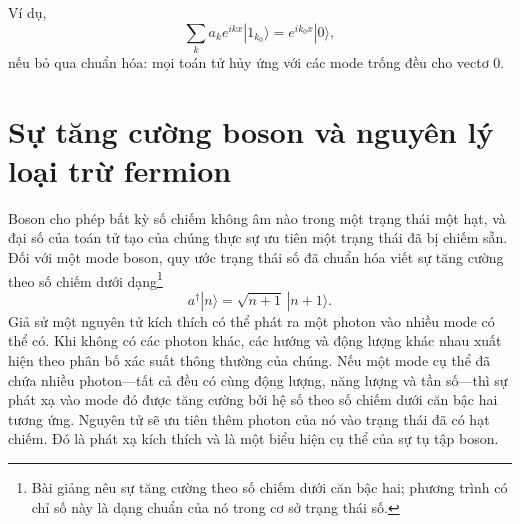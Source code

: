 \begin{classroomqa}
\end{classroomqa}

\begin{classroomqa}
\end{classroomqa}

\begin{classroomqa}
\end{classroomqa}

Ví dụ,
\begin{equation}
\sum_k a_k e^{ikx}|1_{k_0}\rangle
=e^{ik_0x}|0\rangle,
\end{equation}
nếu bỏ qua chuẩn hóa: mọi toán tử hủy ứng với các mode trống đều cho vectơ 0.

\section{Sự tăng cường boson và nguyên lý loại trừ fermion}

Boson cho phép bất kỳ số chiếm không âm nào trong một trạng thái một hạt, và đại số của toán tử tạo của chúng thực sự ưu tiên một trạng thái đã bị chiếm sẵn. Đối với một mode boson, quy ước trạng thái số đã chuẩn hóa viết sự tăng cường theo số chiếm dưới dạng\footnote{Bài giảng nêu sự tăng cường theo số chiếm dưới căn bậc hai; phương trình có chỉ số này là dạng chuẩn của nó trong cơ sở trạng thái số.}
\begin{equation}
a^\dagger|n\rangle=\sqrt{n+1}\,|n+1\rangle.
\end{equation}
Giả sử một nguyên tử kích thích có thể phát ra một photon vào nhiều mode có thể có. Khi không có các photon khác, các hướng và động lượng khác nhau xuất hiện theo phân bố xác suất thông thường của chúng. Nếu một mode cụ thể đã chứa nhiều photon---tất cả đều có cùng động lượng, năng lượng và tần số---thì sự phát xạ vào mode đó được tăng cường bởi hệ số theo số chiếm dưới căn bậc hai tương ứng. Nguyên tử sẽ ưu tiên thêm photon của nó vào trạng thái đã có hạt chiếm. Đó là phát xạ kích thích và là một biểu hiện cụ thể của sự tụ tập boson.

